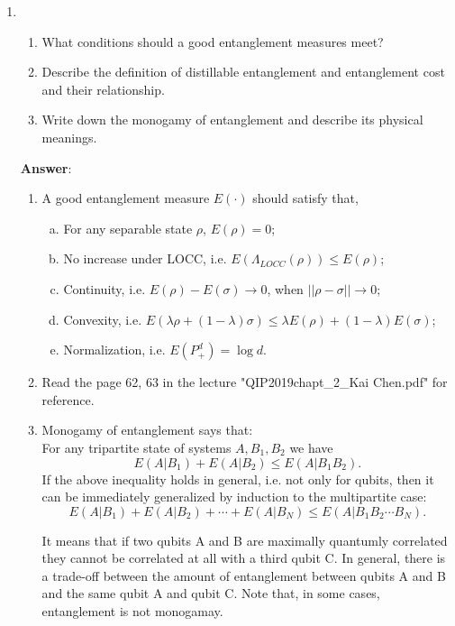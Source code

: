 \documentclass[english,aps,onecolumn]{revtex4-1}
\begin{document}
\begin{enumerate}[1.]
\item
	\begin{enumerate}[(1)]
    \item What conditions should a good entanglement measures meet?
    \item Describe the definition of distillable entanglement and entanglement cost and their relationship.
    \item Write down the monogamy of entanglement and describe its physical meanings.
	\end{enumerate}

\textbf{Answer}:
	\begin{enumerate}[(1)]
    \item A good entanglement measure $E(\cdot)$ should satisfy that,
	\begin{enumerate}[(a)]
        \item For any separable state $\rho$, $E(\rho)=0$;
        \item No increase under LOCC, i.e. $E(\Lambda_{LOCC}(\rho)) \leq E(\rho)$;
        \item Continuity, i.e. $E(\rho)-E(\sigma) \rightarrow 0$, when $||\rho-\sigma|| \rightarrow 0$;
        \item Convexity, i.e. $E(\lambda\rho + (1-\lambda) \sigma) \leq \lambda E(\rho)+ (1-\lambda) E(\sigma)$;
        \item Normalization, i.e. $E(P_+^d)=\log{d}$.

	\end{enumerate}

    \item Read the page 62, 63 in the lecture "QIP2019chapt\_2\_Kai Chen.pdf" for reference.

    \item Monogamy of entanglement says that:\\
    For any tripartite state of systems $A, B_1, B_2$ we have
	$$E(A|B_1)+E(A|B_2) \leq E(A|B_1B_2).$$
 	If the above inequality holds in general, i.e. not only for qubits, then it can be immediately generalized by induction to the multipartite case:
	$$
	E(A|B_1)+E(A|B_2)+ \cdots +E(A|B_N) \leq E(A|B_1B_2 \cdots B_N).
	$$

	It means that if two qubits A and B are maximally quantumly correlated they cannot be correlated at all with a third qubit C. In general, there is a trade-off between the amount of entanglement between qubits A and B and the same qubit A and qubit C. Note that, in some cases, entanglement is not monogamay.
	\end{enumerate}


\end{enumerate}
\end{document}
